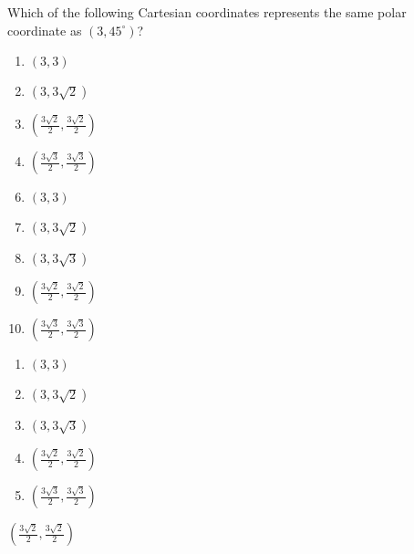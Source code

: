 



 Which of the following Cartesian coordinates represents the same polar coordinate as $(3,45^\circ)$?


\ifsat
	\begin{enumerate}[label=\Alph*)]
		\item    $(3,3)$  
		\item  $(3,3\sqrt{2})$ 
		\item $(\frac{3\sqrt{2}}{2},\frac{3\sqrt{2}}{2})$ %
		\item $(\frac{3\sqrt{3}}{2},\frac{3\sqrt{3}}{2})$ 
	\end{enumerate}
\else
\fi

\ifacteven
	\begin{enumerate}[label=\textbf{\Alph*.},itemsep=\fill,align=left]
		\setcounter{enumii}{5}
		\item    $(3,3)$  
		\item  $(3,3\sqrt{2})$ 
		\item $(3,3\sqrt{3})$
		\addtocounter{enumii}{1}
		\item $(\frac{3\sqrt{2}}{2},\frac{3\sqrt{2}}{2})$ %
		\item $(\frac{3\sqrt{3}}{2},\frac{3\sqrt{3}}{2})$ 
	\end{enumerate}
\else
\fi

\ifactodd
	\begin{enumerate}[label=\textbf{\Alph*.},itemsep=\fill,align=left]
		\item    $(3,3)$  
		\item  $(3,3\sqrt{2})$ 
		\item $(3,3\sqrt{3})$
		\item $(\frac{3\sqrt{2}}{2},\frac{3\sqrt{2}}{2})$ %
		\item $(\frac{3\sqrt{3}}{2},\frac{3\sqrt{3}}{2})$ 
	\end{enumerate}
\else
\fi

\ifgridin
 $(\frac{3\sqrt{2}}{2},\frac{3\sqrt{2}}{2})$ %
		
\else
\fi

